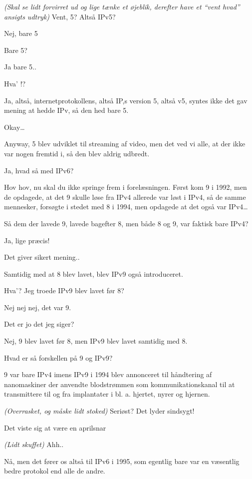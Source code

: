 \documentclass[a4paper,11pt]{article}
\begin{document}
\begin{sketch}
 \textit{(Skal se lidt forvirret ud og lige tænke et øjeblik, derefter have et “vent hvad” ansigts udtryk)} Vent, 5? Altså IPv5? 

 Nej, bare 5

 Bare 5?

 Ja bare 5..

 Hva' !? 

 Ja, altså, internetprotokollens, altså IP,s version 5, altså v5, syntes ikke det gav mening at hedde IPv, så den hed bare 5.

 Okay…

 Anyway, 5 blev udviklet til streaming af video, men det ved vi alle, at der ikke var nogen fremtid i, så den blev aldrig udbredt.

 Ja, hvad så med IPv6?

 Hov hov, nu skal du ikke springe frem i forelæsningen. Først kom 9 i 1992, men de opdagede, at det 9 skulle løse fra IPv4 allerede var løst i IPv4, så de samme mennesker, forsøgte i stedet med 8 i 1994, men opdagede at det også var IPv4…

 Så dem der lavede 9, lavede bagefter 8, men både 8 og 9, var faktisk bare IPv4?

 Ja, lige præcis! 

 Det giver sikert mening..

 Samtidig med at 8 blev lavet, blev IPv9 også introduceret. 

 Hva’? Jeg troede IPv9 blev lavet før 8? 

 Nej nej nej, det var 9.

 Det er jo det jeg siger? 

 Nej, 9 blev lavet før 8, men IPv9 blev lavet samtidig med 8.

 Hvad er så forskellen på 9 og IPv9?

 9 var bare IPv4 imens IPv9 i 1994 blev annonceret til håndtering af nanomaskiner der anvendte blodstrømmen som kommunikationskanal til at transmittere til og fra implantater i bl. a. hjertet, nyrer og hjernen.

 \textit{(Overrasket, og måske lidt stoked)} Seriøst? Det lyder sindsygt!

 Det viste sig at være en aprilsnar

 \textit{(Lidt skuffet)} Ahh..

 Nå, men det fører os altså til IPv6 i 1995, som egentlig bare var en væsentlig bedre protokol end alle de andre.


\end{sketch}
\end{document}
